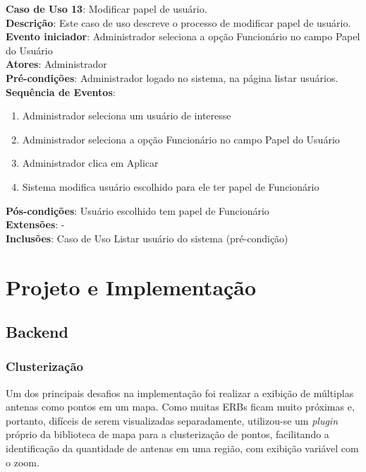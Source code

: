 \documentclass[]{politex}
\begin{document}
\noindent \textbf{Caso de Uso 13}: Modificar papel de usuário. \\
\textbf{Descrição}: Este caso de uso descreve o processo de modificar papel de
usuário. \\
\textbf{Evento iniciador}: Administrador seleciona a opção Funcionário no campo
Papel do Usuário \\
\textbf{Atores}: Administrador \\
\textbf{Pré-condições}: Administrador logado no sistema, na página listar
usuários. \\
\textbf{Sequência de Eventos}:
\begin{enumerate}
\item Administrador seleciona um usuário de interesse
\item Administrador seleciona a opção Funcionário no campo Papel do Usuário
\item Administrador clica em Aplicar
\item Sistema modifica usuário escolhido para ele ter papel de Funcionário
\end{enumerate}
\textbf{Pós-condições}: Usuário escolhido tem papel de Funcionário \\
\textbf{Extensões}: - \\
\textbf{Inclusões}: Caso de Uso Listar usuário do sistema (pré-condição) \\


\chapter{Projeto e Implementação}

\section{Backend}

\subsection{Clusterização}

Um dos principais desafios na implementação foi realizar a exibição de múltiplas
antenas como pontos em um mapa. Como muitas ERBs ficam muito próximas e,
portanto, difíceis de serem visualizadas separadamente, utilizou-se um
\textit{plugin} próprio da biblioteca de mapa para a clusterização de pontos,
facilitando a identificação da quantidade de antenas em uma região, com exibição
variável com o zoom.
\end{document}
